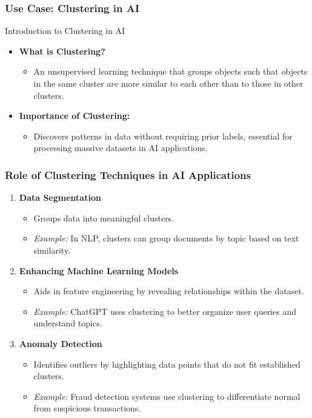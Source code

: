 \documentclass[aspectratio=169]{beamer}
\begin{document}
\begin{frame}[fragile]
    \frametitle{Use Case: Clustering in AI}
    \begin{block}{Introduction to Clustering in AI}
        \begin{itemize}
            \item \textbf{What is Clustering?}
            \begin{itemize}
                \item An unsupervised learning technique that groups objects such that objects in the same cluster are more similar to each other than to those in other clusters.
            \end{itemize}
            \item \textbf{Importance of Clustering:}
            \begin{itemize}
                \item Discovers patterns in data without requiring prior labels, essential for processing massive datasets in AI applications.
            \end{itemize}
        \end{itemize}
    \end{block}
\end{frame}

\begin{frame}[fragile]
    \frametitle{Role of Clustering Techniques in AI Applications}
    \begin{enumerate}
        \item \textbf{Data Segmentation}
        \begin{itemize}
            \item Groups data into meaningful clusters.
            \item \textit{Example:} In NLP, clusters can group documents by topic based on text similarity.
        \end{itemize}
        
        \item \textbf{Enhancing Machine Learning Models}
        \begin{itemize}
            \item Aids in feature engineering by revealing relationships within the dataset.
            \item \textit{Example:} ChatGPT uses clustering to better organize user queries and understand topics.
        \end{itemize}

        \item \textbf{Anomaly Detection}
        \begin{itemize}
            \item Identifies outliers by highlighting data points that do not fit established clusters.
            \item \textit{Example:} Fraud detection systems use clustering to differentiate normal from suspicious transactions.
        \end{itemize}
    \end{enumerate}
\end{frame}
\end{document}

